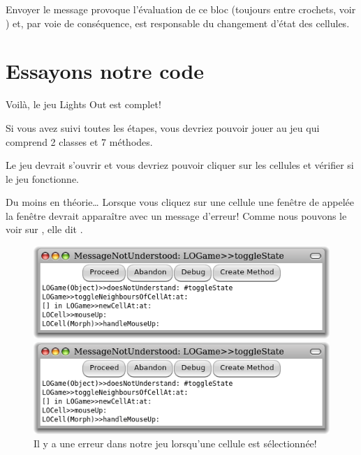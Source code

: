 \documentclass[a4paper,10pt,twoside]{book}
\begin{document}

\noindent
Envoyer le message  provoque l'évaluation de ce bloc
(toujours entre crochets, voir ) et, par voie de
conséquence, est responsable du changement d'état des cellules.

\section{Essayons notre code}

Voilà, le jeu Lights Out est complet!

Si vous avez suivi toutes les étapes, vous devriez pouvoir jouer au jeu qui comprend 2 classes et 7 méthodes.


Le jeu devrait s'ouvrir et vous devriez pouvoir cliquer sur les cellules et vérifier si le jeu fonctionne.

Du moins en théorie\ldots{}
Lorsque vous cliquez sur une cellule une fen\^etre de  appelée la fen\^etre  devrait apparaître avec un message d'erreur!
Comme nous pouvons le voir sur , elle dit .

\begin{figure}[ht]
\ifluluelse
	{\centerline{\includegraphics[width=\textwidth]{Error}}}
	{\centerline{\includegraphics[scale=0.7]{Error}}}
\caption{Il y a une erreur dans notre jeu lorsqu'une cellule est sélectionnée!
  }
\end{figure}
\end{document}
